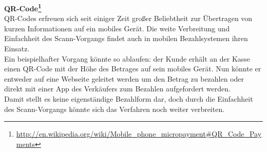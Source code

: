 \textbf{QR-Code\footnote{\url{http://en.wikipedia.org/wiki/Mobile_phone_micropayment\#QR_Code_Payments}}}\\
QR-Codes erfreuen sich seit einiger Zeit großer Beliebtheit zur Übertragen von kurzen Informationen auf ein mobiles Gerät. Die weite Verbreitung und Einfachheit des Scann-Vorgangs findet auch in mobilen Bezahlsystemen ihren Einsatz. \\
Ein beispielhafter Vorgang könnte so ablaufen: der Kunde erhält an der Kasse einen QR-Code mit der Höhe des Betrages auf sein mobiles Gerät. Nun könnte er entweder auf eine Webseite geleitet werden um den Betrag zu bezahlen oder direkt mit einer App des Verkäufers zum Bezahlen aufgefordert werden.\\
Damit stellt es keine eigenständige Bezahlform dar, doch durch die Einfachheit des Scann-Vorgangs könnte sich das Verfahren noch weiter verbreiten. 
